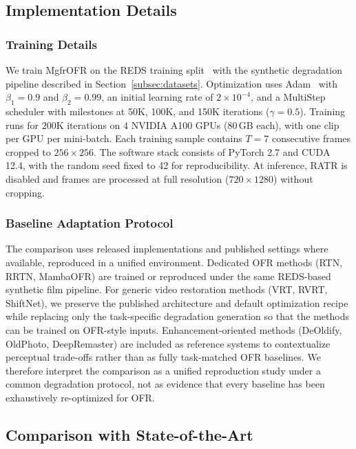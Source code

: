 \subsection{Implementation Details}
\label{subsec:implementation}

\subsubsection{Training Details}
\label{subsubsec:training_details}

We train MgfrOFR on the REDS training split~\cite{nah2019reds} with the synthetic degradation pipeline described in Section~\ref{subsec:datasets}. Optimization uses Adam~\cite{kingma2015adam} with $\beta_1=0.9$ and $\beta_2=0.99$, an initial learning rate of $2\times10^{-4}$, and a MultiStep scheduler with milestones at 50K, 100K, and 150K iterations ($\gamma=0.5$). Training runs for $200$K iterations on $4$ NVIDIA A100 GPUs (80\,GB each), with one clip per GPU per mini-batch. Each training sample contains $T=7$ consecutive frames cropped to $256\times256$. The software stack consists of PyTorch 2.7 and CUDA 12.4, with the random seed fixed to 42 for reproducibility. At inference, RATR is disabled and frames are processed at full resolution ($720 \times 1280$) without cropping.

\subsubsection{Baseline Adaptation Protocol}
\label{subsubsec:baseline_adaptation}

The comparison uses released implementations and published settings where available, reproduced in a unified environment. Dedicated OFR methods (RTN, RRTN, MambaOFR) are trained or reproduced under the same REDS-based synthetic film pipeline. For generic video restoration methods (VRT, RVRT, ShiftNet), we preserve the published architecture and default optimization recipe while replacing only the task-specific degradation generation so that the methods can be trained on OFR-style inputs. Enhancement-oriented methods (DeOldify, OldPhoto, DeepRemaster) are included as reference systems to contextualize perceptual trade-offs rather than as fully task-matched OFR baselines. We therefore interpret the comparison as a unified reproduction study under a common degradation protocol, not as evidence that every baseline has been exhaustively re-optimized for OFR.

\subsection{Comparison with State-of-the-Art}
\label{subsec:comparison_sota}

